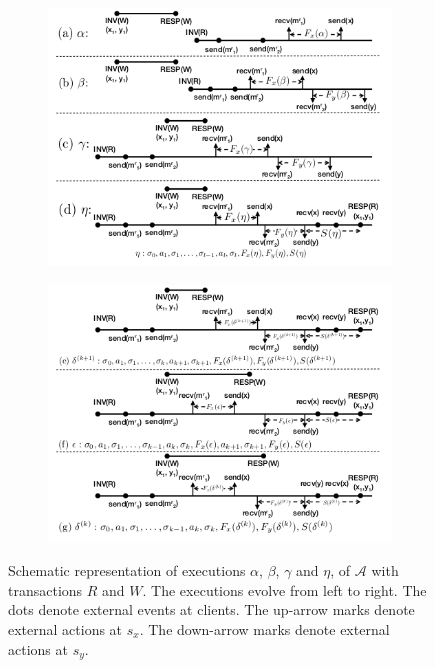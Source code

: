 \begin{figure}[t]
	\hspace*{-1.3cm}
	\begin{subfigure}{0.49\columnwidth}
		\centering
	\includegraphics[width=1.2\linewidth]{figures/fig4.png}
	\end{subfigure}
	\hspace*{0.7cm}  
	\begin{subfigure}{0.49\columnwidth}
		\centering
	\includegraphics[width=1.2\linewidth]{figures/fig5.png}
	\end{subfigure} 
	         \caption{
	         	\small{Schematic representation of executions $\alpha$, $\beta$, $\gamma$ and $\eta$,
	         		of ${\mathcal A}$ with transactions $R$ and $W$. The executions evolve from left to right. 
	         		The dots denote external events at clients. 
	         		The up-arrow marks denote external actions at $s_x$. The down-arrow marks denote external actions at $s_y$.}} \label{fig:execution1}
\end{figure}



